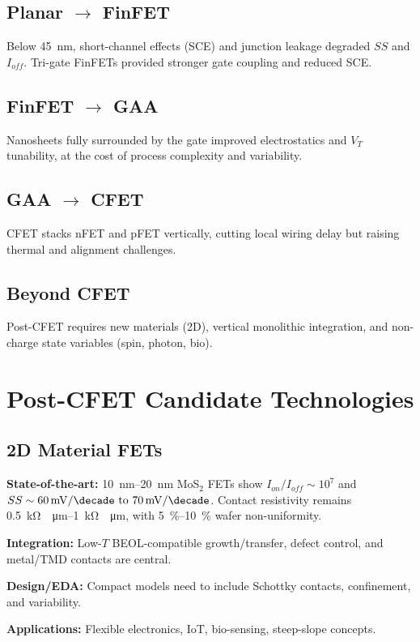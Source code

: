 \documentclass[conference]{IEEEtran}
\begin{document}
\subsection{Planar $\rightarrow$ FinFET}
Below \SI{45}{\nano\meter}, short-channel effects (SCE) and junction leakage degraded $SS$ and $I_{off}$.
Tri-gate FinFETs provided stronger gate coupling and reduced SCE.

\subsection{FinFET $\rightarrow$ GAA}
Nanosheets fully surrounded by the gate improved electrostatics and $V_T$ tunability, at the cost of process complexity and variability.

\subsection{GAA $\rightarrow$ CFET}
CFET stacks nFET and pFET vertically, cutting local wiring delay but raising thermal and alignment challenges.

\subsection{Beyond CFET}
Post-CFET requires new materials (2D), vertical monolithic integration, and non-charge state variables (spin, photon, bio).

\section{Post-CFET Candidate Technologies}

\subsection{2D Material FETs}
\textbf{State-of-the-art:}
\SIrange{10}{20}{\nano\meter} MoS$_2$ FETs show $I_{on}/I_{off}\sim10^7$ and $SS\sim\SIrange{60}{70}{\milli\volt\per\decade}$.
Contact resistivity remains \SIrange{0.5}{1}{\kilo\ohm\cdot\micro\meter}, with \SIrange{5}{10}{\percent} wafer non-uniformity.

\textbf{Integration:}
Low-$T$ BEOL-compatible growth/transfer, defect control, and metal/TMD contacts are central.

\textbf{Design/EDA:}
Compact models need to include Schottky contacts, confinement, and variability.

\textbf{Applications:}
Flexible electronics, IoT, bio-sensing, steep-slope concepts.
\end{document}
